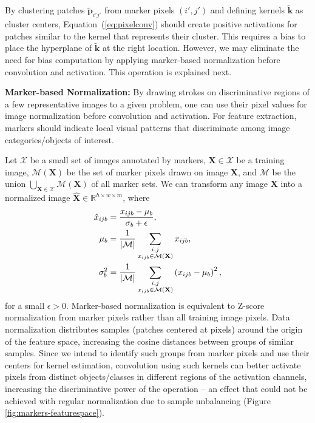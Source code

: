 \documentclass[10pt,twocolumn,twoside]{IEEEtran}
\begin{document}
By clustering patches $\tilde{\mathbf{p}}_{i'j'}$ from marker pixels $(i',j')$ and defining kernels $\tilde{\mathbf{k}}$ as cluster centers, Equation~(\ref{eq:pixelconv}) should create positive activations for patches similar to the kernel that represents their cluster. This requires a bias to place the hyperplane of $\tilde{\mathbf{k}}$ at the right location. However, we may eliminate the need for bias computation by applying marker-based normalization before convolution and activation. This operation is explained next.

\textbf{Marker-based Normalization:} By drawing strokes on discriminative regions of a few representative images to a given problem, one can use their pixel values for image normalization before convolution and activation. For feature extraction, markers should indicate local visual patterns that discriminate among image categories/objects of interest.

Let $\mathcal{X}$ be a small set of images annotated by markers, $\mathbf{X} \in \mathcal{X}$ be a training image, $\mathcal{M}(\mathbf{X})$ be the set of marker pixels drawn on image $\mathbf{X}$, and $\mathcal{M}$ be the union $\bigcup\limits_{\mathbf{X}\in \mathcal{X}} \mathcal{M}(\mathbf{X})$ of all marker sets. We can transform any image $\mathbf{X}$ into a normalized image $\mathbf{\hat{X}} \in \mathbb{R}^{h\times w\times m}$, where
\begin{align}
\label{eq:mb-normalization}
  \hat{x}_{ijb} & = \frac{x_{ijb} - \mu_b}{\sigma_b + \epsilon},\\
  \notag
  \mu_b  & = \frac{1}{|\mathcal{M}|} \sum_{\substack{i,j \\ x_{ijb}\in \mathcal{M}(\mathbf{X})}} x_{ijb}, \\
  \notag
  \sigma^2_b & = \frac{1}{|\mathcal{M}|} \sum_{\substack{i,j \\ x_{ijb} \in \mathcal{M}(\mathbf{X})}} \left(x_{ijb}-\mu_b\right)^2,
\end{align}
for a small $\epsilon>0$. Marker-based normalization is equivalent to Z-score normalization from marker pixels rather than all training image pixels. Data normalization distributes samples (patches centered at pixels) around the origin of the feature space, increasing the cosine distances between groups of similar samples. Since we intend to identify such groups from marker pixels and use their centers for kernel estimation, convolution using such kernels can better activate pixels from distinct objects/classes in different regions of the activation channels, increasing the discriminative power of the operation -- an effect that could not be achieved with regular normalization due to sample unbalancing (Figure \ref{fig:markers-featurespace}).
\end{document}
